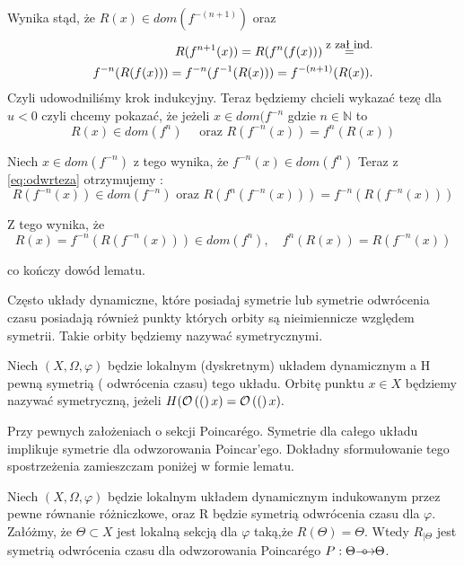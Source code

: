       Wynika stąd, że $ R(x) \in dom(f^{-(n+1)}) $ oraz
     \begin{eqnarray*}
	  R(f^{n+1}(x))=R(f^n(f(x)))\stackrel{\mbox{\small z zał
	  ind.}}=\\f^{-n}(R(f(x)))=f^{-n}(f^{-1}(R(x)))=f^{-(n+1)}(R(x)).
      \end{eqnarray*}
    Czyli udowodniliśmy krok indukcyjny.
    Teraz będziemy chcieli wykazać tezę dla $ u < 0 $ czyli chcemy pokazać,
    że jeżeli $ x \in  dom(f^{-n} $ gdzie $ n \in \mathbb N$ to 
	\begin{equation}
	  R(x) \in dom(f^n) \quad \mbox{ oraz } R(f^{-n}(x)) = f^{n}(R(x))
	\end{equation}
	
    Niech $ x \in dom(f^{-n}) $ z tego wynika, że $ f^{-n}(x) \in dom(f^n) $
    Teraz z \eqref{eq:odwrteza} otrzymujemy :
    $$
      R(f^{-n}(x)) \in dom(f^{-n}) \mbox{ oraz } R(f^{n}(f^{-n}(x))) = f^{-n}(R(f^{-n}(x)))
    $$
    
    Z tego wynika, że
    $$
      R(x) = f^{-n}(R(f^{-n}(x))) \in dom(f^n), \quad f^n(R(x)) = R(f^{-n}(x))
    $$
    
    co kończy dowód lematu.
    
Często układy dynamiczne, które posiadaj symetrie lub symetrie odwrócenia czasu posiadają również punkty
których orbity są nieimiennicze względem symetrii. Takie orbity będziemy nazywać symetrycznymi. 

\begin{definition}
  Niech $(X,\Omega,\varphi) $ będzie lokalnym (dyskretnym) układem dynamicznym a H pewną symetrią ( odwrócenia czasu) tego układu.
  Orbitę punktu $ x\in X $ będziemy nazywać symetryczną, jeżeli $ H(\mathcal O\left((\right)x) = \mathcal O\left((\right)x). $
  
\end{definition}

Przy pewnych założeniach o sekcji Poincar\'ego. Symetrie dla całego układu implikuje symetrie dla odwzorowania Poincar'ego.
Dokładny sformułowanie tego spostrzeżenia zamieszczam poniżej w formie lematu.

\begin{lemma}
  \label{lem:poincareReverse}
  Niech $(X,\Omega,\varphi) $ będzie lokalnym układem dynamicznym indukowanym przez pewne równanie różniczkowe, oraz R będzie
  symetrią odwrócenia czasu dla $ \varphi $. Załóżmy, że $ \Theta \subset X $ jest lokalną sekcją dla $\varphi$ taką,że
  $ R(\Theta) = \Theta$. Wtedy $R_{| \Theta} $ jest symetrią odwrócenia czasu dla odwzorowania Poincar\'ego $ P: \Theta {\mathrel{\longrightarrow\mkern-25mu\circ}\;\;} \Theta$.
\end{lemma}

